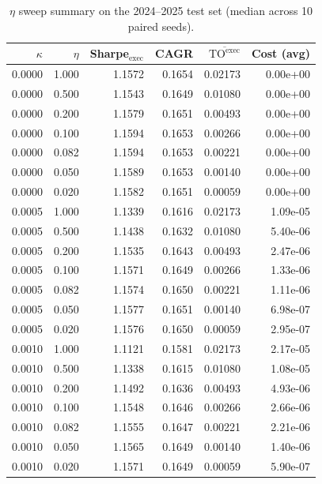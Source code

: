 \documentclass[10pt,twocolumn]{article}
\newcommand{\TOexec}{\mathrm{TO}^{\mathrm{exec}}}
\newcommand{\kappaTC}{\kappa}
\begin{document}
\begin{table}[t]
\centering
\scriptsize
\caption{$\eta$ sweep summary on the 2024--2025 test set (median across 10 paired seeds).}
\label{tab:eta_sweep}
\begin{tabular}{@{}rrrrrr@{}}
\toprule
$\kappaTC$ & $\eta$ & Sharpe$_{\mathrm{exec}}$ & CAGR & $\overline{\TOexec}$ & Cost (avg)\\
\midrule
0.0000 & 1.000 & 1.1572 & 0.1654 & 0.02173 & 0.00e+00 \\
0.0000 & 0.500 & 1.1543 & 0.1649 & 0.01080 & 0.00e+00 \\
0.0000 & 0.200 & 1.1579 & 0.1651 & 0.00493 & 0.00e+00 \\
0.0000 & 0.100 & 1.1594 & 0.1653 & 0.00266 & 0.00e+00 \\
0.0000 & 0.082 & 1.1594 & 0.1653 & 0.00221 & 0.00e+00 \\
0.0000 & 0.050 & 1.1589 & 0.1653 & 0.00140 & 0.00e+00 \\
0.0000 & 0.020 & 1.1582 & 0.1651 & 0.00059 & 0.00e+00 \\
0.0005 & 1.000 & 1.1339 & 0.1616 & 0.02173 & 1.09e-05 \\
0.0005 & 0.500 & 1.1438 & 0.1632 & 0.01080 & 5.40e-06 \\
0.0005 & 0.200 & 1.1535 & 0.1643 & 0.00493 & 2.47e-06 \\
0.0005 & 0.100 & 1.1571 & 0.1649 & 0.00266 & 1.33e-06 \\
0.0005 & 0.082 & 1.1574 & 0.1650 & 0.00221 & 1.11e-06 \\
0.0005 & 0.050 & 1.1577 & 0.1651 & 0.00140 & 6.98e-07 \\
0.0005 & 0.020 & 1.1576 & 0.1650 & 0.00059 & 2.95e-07 \\
0.0010 & 1.000 & 1.1121 & 0.1581 & 0.02173 & 2.17e-05 \\
0.0010 & 0.500 & 1.1338 & 0.1615 & 0.01080 & 1.08e-05 \\
0.0010 & 0.200 & 1.1492 & 0.1636 & 0.00493 & 4.93e-06 \\
0.0010 & 0.100 & 1.1548 & 0.1646 & 0.00266 & 2.66e-06 \\
0.0010 & 0.082 & 1.1555 & 0.1647 & 0.00221 & 2.21e-06 \\
0.0010 & 0.050 & 1.1565 & 0.1649 & 0.00140 & 1.40e-06 \\
0.0010 & 0.020 & 1.1571 & 0.1649 & 0.00059 & 5.90e-07 \\
\bottomrule
\end{tabular}
\end{table}
\end{document}
